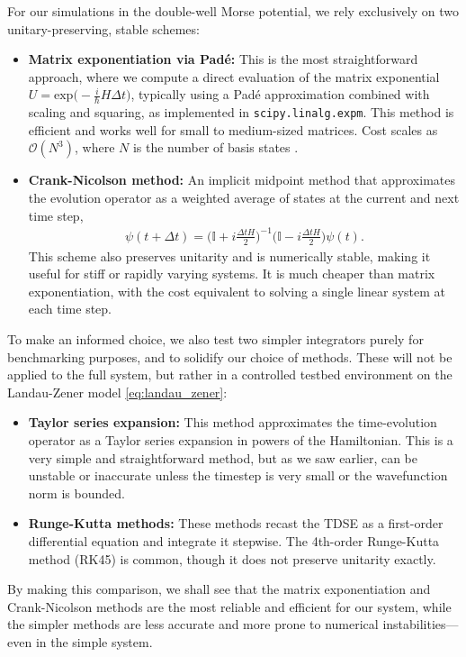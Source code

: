 \documentclass{subfiles}
\begin{document}
For our simulations in the double-well Morse potential, we rely exclusively on two unitary-preserving, stable schemes:
\begin{itemize}
    \item \textbf{Matrix exponentiation via Padé:} This is the most straightforward approach, where we compute a direct evaluation of the matrix exponential $U=\text{exp}\big(-\frac{i}{\hbar}H\Delta t)$, typically using a Padé approximation combined with scaling and squaring, as implemented in \texttt{scipy.linalg.expm}. This method is efficient and works well for small to medium-sized matrices. Cost scales as $\mathcal{O}(N^3)$, where $N$ is the number of basis states \cite{Al-Mohy_Higham_2010}.
    \item \textbf{Crank-Nicolson method:} An implicit midpoint method that approximates the evolution operator as a weighted average of states at the current and next time step,
    \begin{align*}
        \psi(t + \Delta t) = \bigg(\mathbb{I} + i\frac{\Delta t H}{2}\bigg)^{-1} \bigg(\mathbb{I} - i\frac{\Delta t H}{2}\bigg) \psi(t).
    \end{align*}
    This scheme also preserves unitarity and is numerically stable, making it useful for stiff or rapidly varying systems. It is much cheaper than matrix exponentiation, with the cost equivalent to solving a single linear system at each time step.
\end{itemize}
To make an informed choice, we also test two simpler integrators purely for benchmarking purposes, and to solidify our choice of methods. These will not be applied to the full system, but rather in a controlled testbed environment on the Landau-Zener model \eqref{eq:landau_zener}:
\begin{itemize}
    \item \textbf{Taylor series expansion:} This method approximates the time-evolution operator as a Taylor series expansion in powers of the Hamiltonian. This is a very simple and straightforward method, but as we saw earlier, can be unstable or inaccurate unless the timestep is very small or the wavefunction norm is bounded.
    \item \textbf{Runge-Kutta methods:} These methods recast the TDSE as a first-order differential equation and integrate it stepwise. The 4th-order Runge-Kutta method (RK45) is common, though it does not preserve unitarity exactly.
\end{itemize}
By making this comparison, we shall see that the matrix exponentiation and Crank-Nicolson methods are the most reliable and efficient for our system, while the simpler methods are less accurate and more prone to numerical instabilities—even in the simple system.
\end{document}

